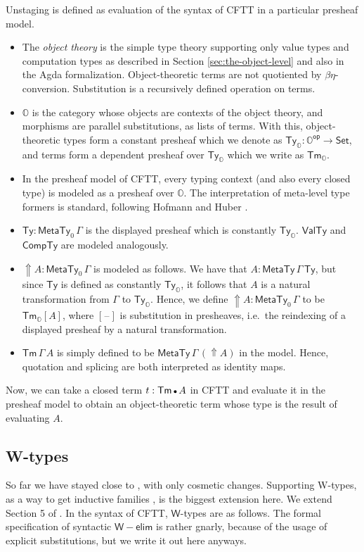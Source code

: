 \documentclass[acmsmall,screen]{acmart}
\newcommand{\msf}[1]{{\mathsf{#1}}}
\newcommand{\mbb}[1]{\mathbb{#1}}
\newcommand{\emptycon}{\scaleobj{.75}\bullet}
\newcommand{\Tyo}{\msf{Ty}_{\mbbo}}
\newcommand{\Tmo}{\msf{Tm}_{\mbbo}}
\newcommand{\mbbo}{\mbb{O}}
\newcommand{\vW}{\mathsf{W}}
\newcommand{\Set}{\msf{Set}}
\newcommand{\Tm}{\msf{Tm}}
\newcommand{\Lift}{{\Uparrow}}
\newcommand{\MTy}{\msf{MetaTy}}
\newcommand{\VTy}{\msf{ValTy}}
\newcommand{\Ty}{\msf{Ty}}
\newcommand{\CTy}{\msf{CompTy}}
\newcommand{\blank}{{\mathord{\hspace{1pt}\text{--}\hspace{1pt}}}}
\theoremstyle{remark}
\begin{document}
Unstaging is defined as evaluation of the syntax of CFTT in a particular
presheaf model.
\begin{itemize}
  \item The \emph{object theory} is the simple type theory supporting only value
    types and computation types as described in Section
    \ref{sec:the-object-level} and also in the Agda
    formalization. Object-theoretic terms are not quotiented by
    $\beta\eta$-conversion. Substitution is a recursively defined operation on
    terms.
  \item $\mbbo$ is the category whose objects are contexts of the object theory,
    and morphisms are parallel substitutions, as lists of terms. With this,
    object-theoretic types form a constant presheaf which we denote
    as $\Tyo : \mbbo^{\msf{op}} \to \Set$, and terms form a dependent presheaf over $\Tyo$ which we write as
    $\Tmo$.
  \item
  In the presheaf model of CFTT, every typing context (and also every closed
  type) is modeled as a presheaf over $\mbbo$. The interpretation of meta-level
  type formers is standard, following Hofmann \cite{Hofmann97syntaxand} and
  Huber \cite{huber-thesis}.
\item $\Ty : \MTy_0\,\Gamma$ is the displayed presheaf which is constantly
  $\Tyo$. $\VTy$ and $\CTy$ are modeled analogously.
\item $\Lift A : \MTy_0\,\Gamma$ is modeled as follows. We have that $A :
  \MTy\,\Gamma\,\Ty$, but since $\Ty$ is defined as constantly $\Tyo$, it
  follows that $A$ is a natural transformation from $\Gamma$ to $\Tyo$. Hence,
  we define $\Lift A : \MTy_0\,\Gamma$ to be $\Tmo[A]$, where $[\blank]$ is
  substitution in presheaves, i.e.\ the reindexing of a displayed presheaf by a
  natural transformation.
\item
  $\Tm\,\Gamma\,A$ is simply defined to be $\MTy\,\Gamma\,(\Lift A)$ in the model. Hence,
  quotation and splicing are both interpreted as identity maps.
\end{itemize}
Now, we can take a closed term $t : \Tm\,\emptycon\,A$ in CFTT and evaluate it
in the presheaf model to obtain an object-theoretic term whose type is the
result of evaluating $A$.

\subsection{W-types}
So far we have stayed close to \cite{staged2ltt}, with only cosmetic
changes. Supporting W-types, as a way to get inductive families \cite{whynotw},
is the biggest extension here. We extend Section 5 of \cite{staged2ltt}. In the
syntax of CFTT, $\vW$-types are as follows. The formal specification of
syntactic $\vW{-}\msf{elim}$ is rather gnarly, because of the usage of explicit
substitutions, but we write it out here anyways.
\end{document}
